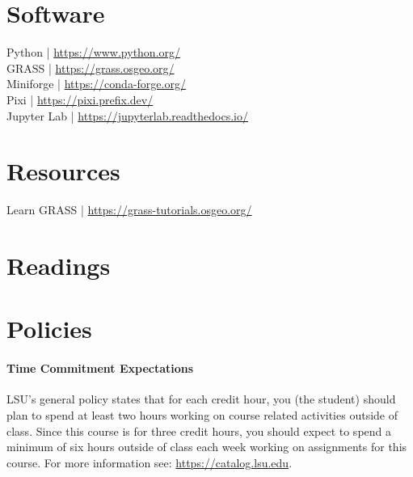 \documentclass[11pt,article,oneside]{memoir}
\begin{document}

\section{Software}

Python | \url{https://www.python.org/}\\
GRASS | \url{https://grass.osgeo.org/}\\
Miniforge | \url{https://conda-forge.org/}\\
Pixi | \url{https://pixi.prefix.dev/}\\
Jupyter Lab | \url{https://jupyterlab.readthedocs.io/}




\section{Resources}

Learn GRASS | \url{https://grass-tutorials.osgeo.org/}


\section{Readings}
\vspace*{0.5cm}
\nocite{*}
\setlength{}
\printbibliography[heading=none]


\section{Policies}

\paragraph{Time Commitment Expectations}
LSU's general policy states that for each credit hour, 
you (the student) should plan to
spend at least two hours working 
on course related activities outside of class. 
Since this course is for three credit hours, 
you should expect to spend a minimum of six hours 
outside of class each week 
working on assignments for this course. 
For more information see: 
\url{https://catalog.lsu.edu}.
\end{document}
